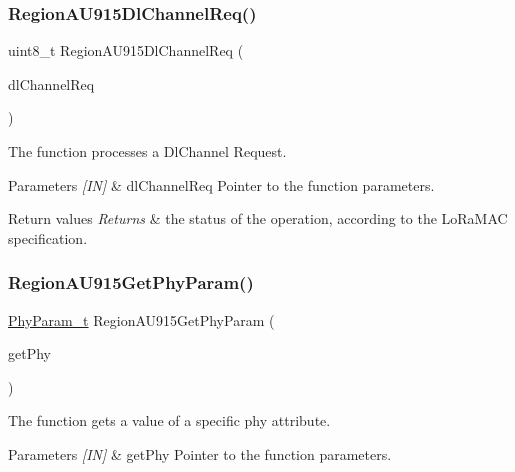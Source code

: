 \subsubsection{\texorpdfstring{Region\+A\+U915\+Dl\+Channel\+Req()}{RegionAU915DlChannelReq()}}
{\footnotesize\ttfamily uint8\+\_\+t Region\+A\+U915\+Dl\+Channel\+Req (\begin{DoxyParamCaption}\item[{\hyperlink{group__REGION_gae0d608ff1f8ea0a430e4f9a4c38ec7f3}{Dl\+Channel\+Req\+Params\+\_\+t} $\ast$}]{dl\+Channel\+Req }\end{DoxyParamCaption})}



The function processes a Dl\+Channel Request. 


\begin{DoxyParams}{Parameters}
{\em \mbox{[}\+I\+N\mbox{]}} & dl\+Channel\+Req Pointer to the function parameters.\\
\hline
\end{DoxyParams}

\begin{DoxyRetVals}{Return values}
{\em Returns} & the status of the operation, according to the Lo\+Ra\+M\+AC specification. \\
\hline
\end{DoxyRetVals}
\mbox{\label{group__REGIONAU915_ga91322f6f4dc9d6155316edd4dc198830}} 
\subsubsection{\texorpdfstring{Region\+A\+U915\+Get\+Phy\+Param()}{RegionAU915GetPhyParam()}}
{\footnotesize\ttfamily \hyperlink{group__REGION_gaed159b26e5c4677236b6e8677019db30}{Phy\+Param\+\_\+t} Region\+A\+U915\+Get\+Phy\+Param (\begin{DoxyParamCaption}\item[{\hyperlink{group__REGION_gab471483fff904f4f89bbc03f7fc380ab}{Get\+Phy\+Params\+\_\+t} $\ast$}]{get\+Phy }\end{DoxyParamCaption})}



The function gets a value of a specific phy attribute. 


\begin{DoxyParams}{Parameters}
{\em \mbox{[}\+I\+N\mbox{]}} & get\+Phy Pointer to the function parameters.\\
\hline
\end{DoxyParams}

